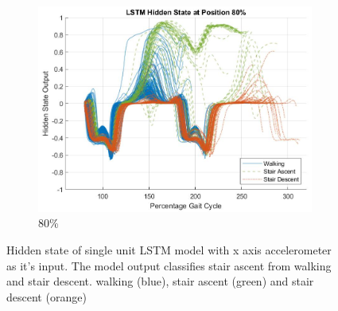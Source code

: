 \documentclass[sensors,article,submit,moreauthors,pdftex]{Definitions/mdpi}
\begin{document}
\begin{figure}[!hbt]
     \begin{subfigure}[b]{0.32\textwidth}
         \centering
         \includegraphics[width=\textwidth]{Figures/results/hidden_state/gyro_y_w_v_sa-sd/80_Participant_04.jpg}
         \caption{80\%}
         \label{subfig:gyro_y_w_v_sa_sd_80}
     \end{subfigure}
    \caption{Hidden state of single unit LSTM model with x axis accelerometer as it's input. The model output classifies stair ascent from walking and stair descent. walking (blue), stair ascent (green) and stair descent (orange)}
    \label{fig:hidden-state-gyro-y-w_v_sa-sd}
\end{figure}
\end{document}
